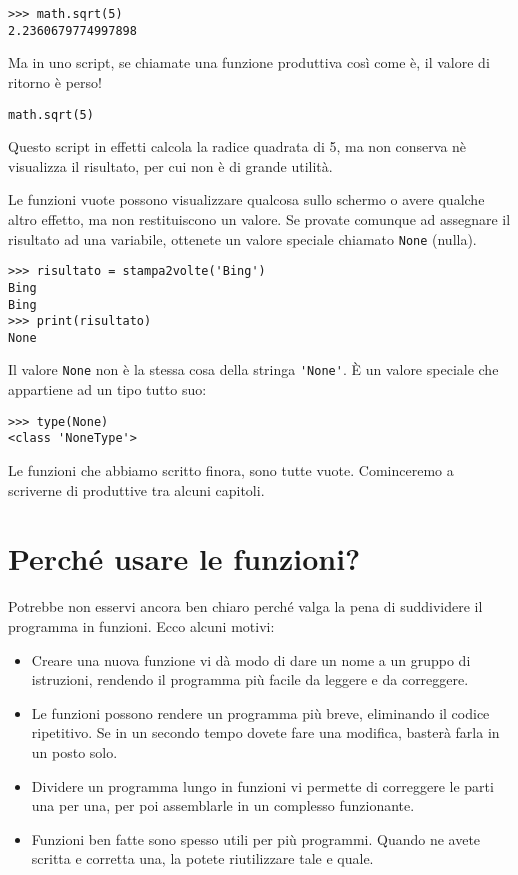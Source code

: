 \documentclass[10pt]{book}
\begin{document}
\begin{verbatim}
>>> math.sqrt(5)
2.2360679774997898
\end{verbatim}
%
Ma in uno script, se chiamate una funzione produttiva così come è, il valore di ritorno è perso!

\begin{verbatim}
math.sqrt(5)
\end{verbatim}
%
Questo script in effetti calcola la radice quadrata di 5, ma non conserva nè visualizza il risultato, per cui non è di grande utilità.

Le funzioni vuote possono visualizzare qualcosa sullo schermo o avere qualche altro effetto, ma non restituiscono un valore. Se provate comunque ad assegnare il risultato ad una variabile, ottenete un valore speciale chiamato
{\tt None} (nulla).

\begin{verbatim}
>>> risultato = stampa2volte('Bing')
Bing
Bing
>>> print(risultato)
None
\end{verbatim}
%
Il valore {\tt None} non è la stessa cosa della stringa \verb"'None'". 
È un valore speciale che appartiene ad un tipo tutto suo:

\begin{verbatim}
>>> type(None)
<class 'NoneType'>
\end{verbatim}
%
Le funzioni che abbiamo scritto finora, sono tutte vuote. Cominceremo a scriverne di produttive tra alcuni capitoli.


\section{Perché usare le funzioni?}

Potrebbe non esservi ancora ben chiaro perché valga la pena di suddividere il programma in funzioni. Ecco alcuni motivi:

\begin{itemize}

\item Creare una nuova funzione vi dà modo di dare un nome a un gruppo di istruzioni, rendendo il programma più facile da leggere e da correggere.

\item Le funzioni possono rendere un programma più breve, eliminando il codice ripetitivo. Se in un secondo tempo dovete fare una modifica, basterà farla in un posto solo.

\item Dividere un programma lungo in funzioni vi permette di correggere le parti una per una, per poi assemblarle in un complesso funzionante.

\item Funzioni ben fatte sono spesso utili per più programmi. Quando ne avete scritta e corretta una, la potete riutilizzare tale e quale.

\end{itemize}
\end{document}
